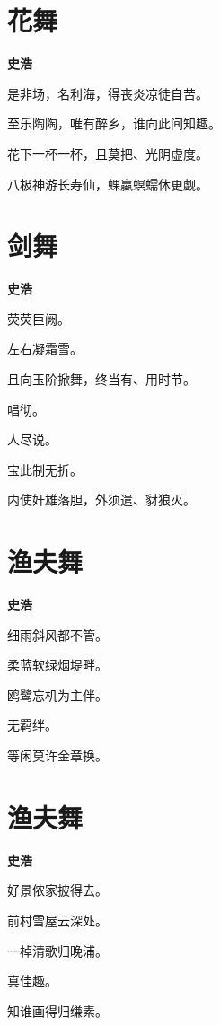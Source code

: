 \documentclass[12pt,a4paper]{ctexbook}
\begin{document}
\section{花舞}
\textbf{史浩}\par\vspace{0.5em}
是非场，名利海，得丧炎凉徒自苦。\par
至乐陶陶，唯有醉乡，谁向此间知趣。\par
花下一杯一杯，且莫把、光阴虚度。\par
八极神游长寿仙，蜾蠃螟蠕休更觑。\par

\section{剑舞}
\textbf{史浩}\par\vspace{0.5em}
荧荧巨阙。\par
左右凝霜雪。\par
且向玉阶掀舞，终当有、用时节。\par
唱彻。\par
人尽说。\par
宝此制无折。\par
内使奸雄落胆，外须遣、豺狼灭。\par

\section{渔夫舞}
\textbf{史浩}\par\vspace{0.5em}
细雨斜风都不管。\par
柔蓝软绿烟堤畔。\par
鸥鹭忘机为主伴。\par
无羁绊。\par
等闲莫许金章换。\par

\section{渔夫舞}
\textbf{史浩}\par\vspace{0.5em}
好景侬家披得去。\par
前村雪屋云深处。\par
一棹清歌归晚浦。\par
真佳趣。\par
知谁画得归缣素。\par
\end{document}
